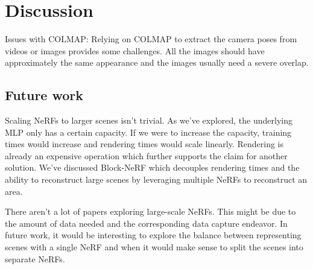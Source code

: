 \chapter{Discussion}

\begin{comment}
- Loop back to the introduction, review - claim - agenda
    - In this thesis, we have seen how we can reconstruct 3D scenes and render novel views by optimizing NeRFs on 2D input images.
    - The pipeline for creating NeRFs has become greatly simplified recently. As we've seen we can without problems optimize a NeRF in ~4.5 minutes.
\end{comment}

Issues with COLMAP: Relying on COLMAP to extract the camera poses from videos or images provides some challenges. All the images should have approximately the same appearance and the images usually need a severe overlap.

\section{Future work}
Scaling NeRFs to larger scenes isn't trivial. As we've explored, the underlying MLP only has a certain capacity. If we were to increase the capacity, training times would increase and rendering times would scale linearly. Rendering is already an expensive operation which further supports the claim for another solution. We've discussed Block-NeRF which decouples rendering times and the ability to reconstruct large scenes by leveraging multiple NeRFs to reconstruct an area.

There aren't a lot of papers exploring large-scale NeRFs. This might be due to the amount of data needed and the corresponding data capture endeavor. In future work, it would be interesting to explore the balance between representing scenes with a single NeRF and when it would make sense to split the scenes into separate NeRFs.